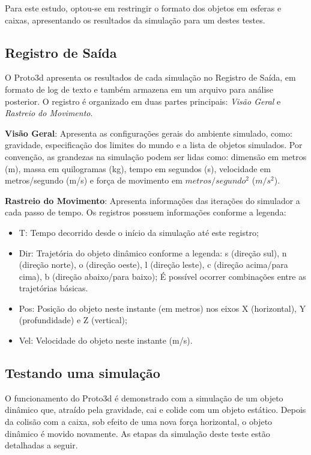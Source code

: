 \documentclass[12pt]{article}
\begin{document}
Para este estudo, optou-se em restringir o formato dos objetos em esferas e caixas, apresentando os resultados da simulação para um destes testes.

\subsection{Registro de Saída}
O Proto3d apresenta os resultados de cada simulação no Registro de Saída, em formato de log de texto e também armazena em um arquivo para análise posterior. O registro é organizado em duas partes principais: \emph{Visão Geral} e \emph{Rastreio do Movimento}.

\textbf{Visão Geral}: Apresenta as configurações gerais do ambiente simulado, como: gravidade, especificação dos limites do mundo e a lista de objetos simulados. Por convenção, as grandezas na simulação podem ser lidas como: dimensão em metros (m), massa em quilogramas (kg), tempo em segundos (s), velocidade em metros/segundo (m/s) e força de movimento em $metros/segundo^{2}$ ($m/s^{2}$).

\textbf{Rastreio do Movimento}: Apresenta informações das iterações do simulador a cada passo de tempo. Os registros possuem informações conforme a legenda:

\begin{itemize}
	\item T: Tempo decorrido desde o início da simulação até este registro;
	\item Dir: Trajetória do objeto dinâmico conforme a legenda: s (direção sul), n (direção norte), o (direção oeste), l (direção leste), c (direção acima/para cima), b (direção abaixo/para baixo); É possível ocorrer combinações entre as trajetórias básicas. 
	\item Pos: Posição do objeto neste instante (em metros) nos eixos X (horizontal), Y (profundidade) e Z (vertical);
	\item Vel: Velocidade do objeto neste instante (m/s).
\end{itemize}

\subsection{Testando uma simulação}
O funcionamento do Proto3d é demonstrado com a simulação de um objeto dinâmico que, atraído pela gravidade, cai e colide com um objeto estático. Depois da colisão com a caixa, sob efeito de uma nova força horizontal, o objeto dinâmico é movido novamente. As etapas da simulação deste teste estão detalhadas a seguir.  
\end{document}

